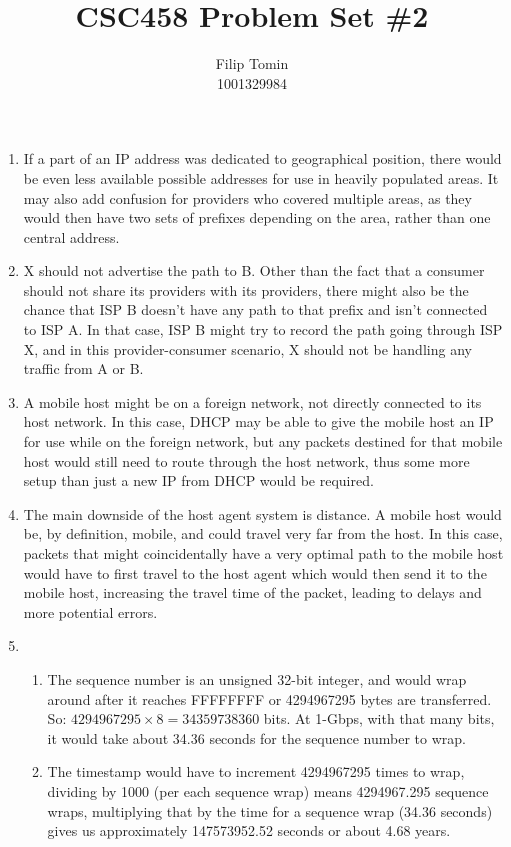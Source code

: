 \documentclass[12pt]{article}
\title{CSC458 Problem Set \#2\\}
\author{Filip Tomin\\
\normalsize{1001329984}}
\date{}
\begin{document}
\maketitle
\begin{enumerate}
\item %
If a part of an IP address was dedicated to geographical position, there would be even less available possible addresses for use in heavily populated areas. It may also add confusion for providers who covered multiple areas, as they would then have two sets of prefixes depending on the area, rather than one central address.
\item %
X should not advertise the path to B. Other than the fact that a consumer should not share its providers with its providers, there might also be the chance that ISP B doesn't have any path to that prefix and isn't connected to ISP A. In that case, ISP B might try to record the path going through ISP X, and in this provider-consumer scenario, X should not be handling any traffic from A or B.
\item %
A mobile host might be on a foreign network, not directly connected to its host network. In this case, DHCP may be able to give the mobile host an IP for use while on the foreign network, but any packets destined for that mobile host would still need to route through the host network, thus some more setup than just a new IP from DHCP would be required.
\item %
The main downside of the host agent system is distance. A mobile host would be, by definition, mobile, and could travel very far from the host. In this case, packets that might coincidentally have a very optimal path to the mobile host would have to first travel to the host agent which would then send it to the mobile host, increasing the travel time of the packet, leading to delays and more potential errors.
\item %
\begin{enumerate}
\item %
The sequence number is an unsigned 32-bit integer, and would wrap around after it reaches FFFFFFFF or 4294967295 bytes are transferred. So: $4294967295\times 8 = 34359738360$ bits. At 1-Gbps, with that many bits, it would take about 34.36 seconds for the sequence number to wrap.
\item %
The timestamp would have to increment 4294967295 times to wrap, dividing by 1000 (per each sequence wrap) means 4294967.295 sequence wraps, multiplying that by the time for a sequence wrap (34.36 seconds) gives us approximately 147573952.52 seconds or about 4.68 years.

\end{enumerate}
\end{enumerate}
\end{document}
